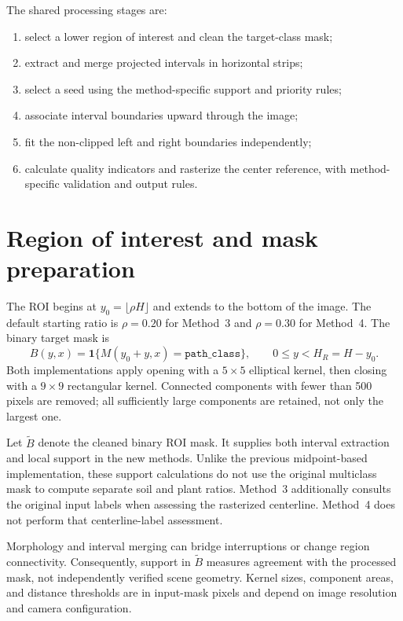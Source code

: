 The shared processing stages are:
\begin{enumerate}
    \item select a lower region of interest and clean the target-class mask;
    \item extract and merge projected intervals in horizontal strips;
    \item select a seed using the method-specific support and priority rules;
    \item associate interval boundaries upward through the image;
    \item fit the non-clipped left and right boundaries independently;
    \item calculate quality indicators and rasterize the center reference,
    with method-specific validation and output rules.
\end{enumerate}

\section{Region of interest and mask preparation}
\label{sec:c4_roi}

The ROI begins at $y_0=\lfloor\rho H\rfloor$ and extends to the bottom
of the image. The default starting ratio is $\rho=0.20$ for Method~3
and $\rho=0.30$ for Method~4. The binary target mask is
\begin{equation}
    B(y,x)=\mathbf{1}\{M(y_0+y,x)=\texttt{path\_class}\},
    \qquad 0\leq y<H_R=H-y_0.
\end{equation}
Both implementations apply opening with a $5\times5$ elliptical kernel,
then closing with a $9\times9$ rectangular kernel. Connected components
with fewer than 500 pixels are removed; all sufficiently large components
are retained, not only the largest one.

Let $\widetilde B$ denote the cleaned binary ROI mask. It supplies both
interval extraction and local support in the new methods. Unlike the
previous midpoint-based implementation, these support calculations do
not use the original multiclass mask to compute separate soil and plant
ratios. Method~3 additionally consults the original input labels when
assessing the rasterized centerline. Method~4 does not perform that
centerline-label assessment.

Morphology and interval merging can bridge interruptions or change region
connectivity. Consequently, support in $\widetilde B$ measures agreement
with the processed mask, not independently verified scene geometry.
Kernel sizes, component areas, and distance thresholds are in input-mask
pixels and depend on image resolution and camera configuration.


